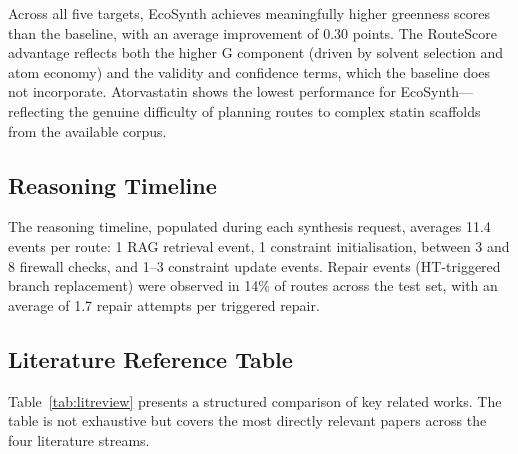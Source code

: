 \documentclass[12pt,a4paper]{article}
\begin{document}
Across all five targets, EcoSynth achieves meaningfully higher greenness scores
than the baseline, with an average improvement of 0.30 points. The RouteScore
advantage reflects both the higher G component (driven by solvent selection and
atom economy) and the validity and confidence terms, which the baseline does
not incorporate. Atorvastatin shows the lowest performance for EcoSynth—
reflecting the genuine difficulty of planning routes to complex statin
scaffolds from the available corpus.

\subsection{Reasoning Timeline}

The reasoning timeline, populated during each synthesis request, averages 11.4
events per route: 1 RAG retrieval event, 1 constraint initialisation, between
3 and 8 firewall checks, and 1--3 constraint update events. Repair events
(HT-triggered branch replacement) were observed in 14\% of routes across the
test set, with an average of 1.7 repair attempts per triggered repair.

\subsection{Literature Reference Table}

Table~\ref{tab:litreview} presents a structured comparison of key related
works. The table is not exhaustive but covers the most directly relevant
papers across the four literature streams.
\end{document}
